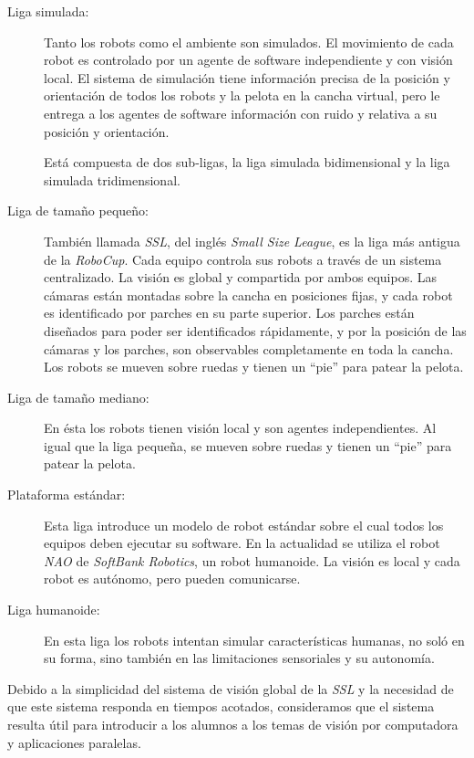 \begin{description}

	\item[Liga simulada:] Tanto los robots como el ambiente son simulados.
		El movimiento de cada robot es controlado por un agente de
		software independiente y con visión local. El sistema de
		simulación tiene información precisa de la posición y
		orientación de todos los robots y la pelota en la cancha
		virtual, pero le entrega a los agentes de software información
		con ruido y relativa a su posición y orientación.

		Está compuesta de dos sub-ligas, la liga simulada
		bidimensional y la liga simulada tridimensional.

	\item[Liga de tamaño pequeño:] También llamada \emph{SSL}, del inglés
		\emph{Small Size League}, es la liga más antigua de la
		\emph{RoboCup}. Cada equipo controla sus robots a través de un
		sistema centralizado. La visión es global y compartida por ambos
		equipos. Las cámaras están montadas sobre la cancha en
		posiciones fijas, y cada robot es identificado por parches en su
		parte superior. Los parches están diseñados para poder ser
		identificados rápidamente, y por la posición de las cámaras y
		los parches, son observables completamente en toda la cancha.
		Los robots se mueven sobre ruedas y tienen un ``pie'' para
		patear la pelota.

	\item[Liga de tamaño mediano:] En ésta los robots tienen visión local
		y son agentes independientes. Al igual que la liga pequeña, se
		mueven sobre ruedas y tienen un ``pie'' para patear la pelota.

	\item[Plataforma estándar:] Esta liga introduce un modelo de robot
		estándar sobre el cual todos los equipos deben ejecutar su
		software. En la actualidad se utiliza el robot \emph{NAO} de
		\emph{SoftBank Robotics}, un robot humanoide. La visión es
		local y cada robot es autónomo, pero pueden comunicarse.

	\item[Liga humanoide:] En esta liga los robots intentan simular
		características humanas, no soló en su forma, sino también en
		las limitaciones sensoriales y su autonomía.

\end{description}

Debido a la simplicidad del sistema de visión global de la \emph{SSL} y la
necesidad de que este sistema responda en tiempos acotados, consideramos que el
sistema resulta útil para introducir a los alumnos a los temas de visión por
computadora y aplicaciones paralelas.

